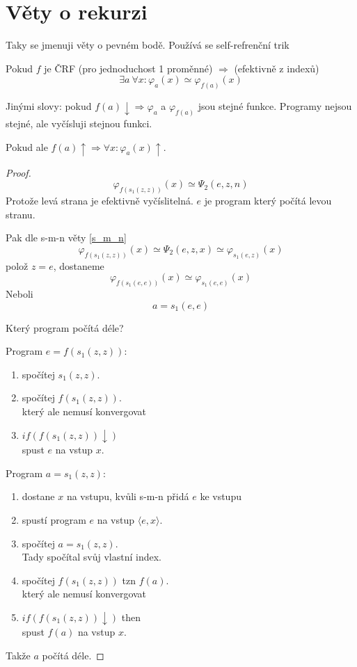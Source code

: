 \section{\texorpdfstring{Věty o rekurzi}{Věty o rekurzi}}
\vspace{5mm}
\large

\begin{note}
	Taky se jmenuji věty o pevném bodě. Používá se self-refrenční trik
\end{note}

\begin{theorem}[O rekurzi 1]\label{rek_1}
	Pokud $f$ je ČRF (pro jednoduchost 1 proměnné) $\Rightarrow$ (efektivně z indexů)
	\[ \exists a\ \forall x: \varphi_a(x) \simeq \varphi_{f(a)} (x) \]

	Jinými slovy: pokud $f(a) \downarrow \Rightarrow \varphi_a$ a $\varphi_{f(a)}$ jsou stejné funkce.
	Programy nejsou stejné, ale vyčísluji stejnou funkci.

	Pokud ale $f(a) \uparrow \Rightarrow \forall x: \varphi_a(x) \uparrow$.
\end{theorem}
\begin{proof}
	\[ \varphi_{f(s_1(z, z))} (x) \simeq \Psi_2(e, z, n) \]
	Protože levá strana je efektivně vyčíslitelná. $e$ je program který počítá levou stranu.

	Pak dle s-m-n věty \cref{s_m_n}
	\[ \varphi_{f(s_1(z, z))} (x) \simeq \Psi_2(e, z, x) \simeq \varphi_{s_1(e, z)} (x) \]
	polož $z = e$, dostaneme
	\[ \varphi_{f(s_1(e, e))} (x) \simeq \varphi_{s_1(e, e)} (x) \]
	Neboli
	\[ a = s_1(e, e) \]


	Který program počítá déle?

	Program $e = f(s_1(z, z))$:
	\begin{enumerate}
		\item spočítej $s_1(z, z)$.
		\item spočítej $f(s_1(z, z))$.\\
			který ale nemusí konvergovat
		\item $if(f(s_1(z, z)) \downarrow)$\\
			spust $e$ na vstup $x$.
	\end{enumerate}

	Program $a = s_1(z, z)$:
	\begin{enumerate}
		\item dostane $x$ na vstupu, kvůli s-m-n přidá $e$ ke vstupu
		\item spustí program $e$ na vstup $\langle e, x \rangle$.
		\item spočítej $a = s_1(z, z)$.\\
			Tady spočítal svůj vlastní index.
		\item spočítej $f(s_1(z, z))$ tzn $f(a)$.\\
			který ale nemusí konvergovat
		\item $if(f(s_1(z, z)) \downarrow)$ then \\
			spust $f(a)$ na vstup $x$.
	\end{enumerate}

	Takže $a$ počítá déle.
\end{proof}


